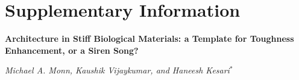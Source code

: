 \documentclass[12pt,onecolumn]{article}
\begin{document}





\doublespacing
\clearpage
\pagebreak
\onecolumn

\setcounter{page}{1}

\setcounter{section}{0}
\renewcommand{\thesection}{S\arabic{section}}

\setcounter{equation}{0}
\renewcommand{\theequation}{S\arabic{equation}}

\setcounter{figure}{0}
\renewcommand{\thefigure}{S\arabic{figure}}
\setcounter{table}{0}
\renewcommand{\thetable}{S\arabic{table}}

\part*{Supplementary Information}

\textbf{Architecture in Stiff Biological Materials: a Template for Toughness Enhancement, or a Siren Song?}

\textit{Michael A. Monn, Kaushik Vijaykumar, and Haneesh Kesari$^*$}
\end{document}
